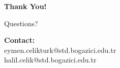 \documentclass[aspectratio=169]{beamer}
\begin{document}
\begin{frame}[plain]
\begin{center}
\Huge \textbf{Thank You!}

\vspace{1cm}

\Large Questions?

\vspace{1cm}

\normalsize
\textbf{Contact:}\\
eymen.celikturk@std.bogazici.edu.tr \\
halil.celik@std.bogazici.edu.tr

\end{center}
\end{frame}
\end{document}
